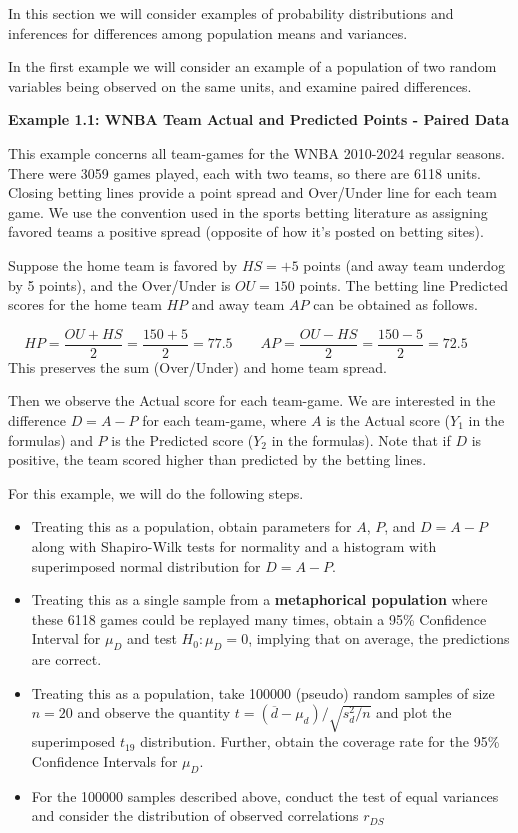 \documentclass[
]{book}
\providecommand{\tightlist}{%
  \setlength{\itemsep}{0pt}\setlength{\parskip}{0pt}}
\begin{document}
In this section we will consider examples of probability distributions
and inferences for differences among population means and variances.

In the first example we will consider an example of a population of two
random variables being observed on the same units, and examine paired
differences.

\textbf{Example 1.1: WNBA Team Actual and Predicted Points - Paired
Data}

This example concerns all team-games for the WNBA 2010-2024 regular
seasons. There were 3059 games played, each with two teams, so there are
6118 units. Closing betting lines provide a point spread and Over/Under
line for each team game. We use the convention used in the sports
betting literature as assigning favored teams a positive spread
(opposite of how it's posted on betting sites).

Suppose the home team is favored by \(HS=+5\) points (and away team
underdog by 5 points), and the Over/Under is \(OU=150\) points. The
betting line Predicted scores for the home team \(HP\) and away team
\(AP\) can be obtained as follows.

\[ HP = \frac{OU+HS}{2}=\frac{150+5}{2}=77.5   \qquad  
AP = \frac{OU-HS}{2}=\frac{150-5}{2}=72.5   \qquad
\] This preserves the sum (Over/Under) and home team spread.

Then we observe the Actual score for each team-game. We are interested
in the difference \(D=A-P\) for each team-game, where \(A\) is the
Actual score (\(Y_1\) in the formulas) and \(P\) is the Predicted score
(\(Y_2\) in the formulas). Note that if \(D\) is positive, the team
scored higher than predicted by the betting lines.

For this example, we will do the following steps.

\begin{itemize}
\tightlist
\item
  Treating this as a population, obtain parameters for \(A\), \(P\), and
  \(D=A-P\) along with Shapiro-Wilk tests for normality and a histogram
  with superimposed normal distribution for \(D=A-P\).
\item
  Treating this as a single sample from a \textbf{metaphorical
  population} where these 6118 games could be replayed many times,
  obtain a 95\% Confidence Interval for \(\mu_D\) and test
  \(H_0:\mu_D=0\), implying that on average, the predictions are
  correct.
\item
  Treating this as a population, take 100000 (pseudo) random samples of
  size \(n=20\) and observe the quantity
  \(t=\left(\overline{d}-\mu_d\right)/\sqrt{s_d^2/n}\) and plot the
  superimposed \(t_{19}\) distribution. Further, obtain the coverage
  rate for the 95\% Confidence Intervals for \(\mu_D\).
\item
  For the 100000 samples described above, conduct the test of equal
  variances and consider the distribution of observed correlations
  \(r_{DS}\)
\end{itemize}
\end{document}
